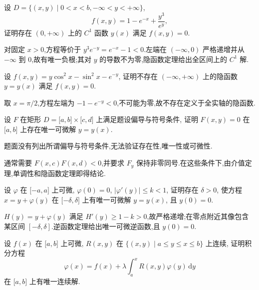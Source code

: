 \begin{example}
    设 $D=\{(x,y)\mid0<x<b,-\infty<y<+\infty\}$,
    \[
        f(x,y)=1-e^{-x}+\dfrac{y^3}{e^y},
    \]
    证明存在 $(0,+\infty)$ 上的 $C^1$ 函数 $y(x)$ 满足 $f(x,y)=0$.
\end{example}
\exampleblank

\begin{solution}
    对固定 $x>0$,方程等价于 $y^3e^{-y}=e^{-x}-1<0$.左端在 $(-\infty,0)$ 严格递增并从 $-\infty$ 到 $0$,故有唯一负根;其对 $y$ 的导数不为零,隐函数定理给出全区间上的 $C^1$ 解.
\end{solution}

\begin{example}
    设 $f(x,y)=y\cos^2x-\sin^2x-e^{-y}$, 证明不存在 $(-\infty,+\infty)$ 上的隐函数 $y=y(x)$ 满足 $f(x,y)=0$.
\end{example}
\exampleblank

\begin{solution}
    取 $x=\pi/2$,方程左端为 $-1-e^{-y}<0$,不可能为零,故不存在定义于全实轴的隐函数.
\end{solution}

\begin{example}
    设 $F$ 在矩形 $D=\lbrack a,b\rbrack\times\lbrack c,d\rbrack$ 上满足题设偏导与符号条件, 证明 $F(x,y)=0$ 在 $\lbrack a,b\rbrack$ 上存在唯一可微解 $y=y(x)$.
\end{example}
\exampleblank

\begin{solution}
    题面没有列出所谓偏导与符号条件,无法验证存在性,唯一性或可微性.

    通常需要 $F(x,c)F(x,d)<0$,并要求 $F_y$ 保持非零同号.在这些条件下,由介值定理,单调性和隐函数定理即得结论.
\end{solution}

\begin{example}
    设 $\varphi$ 在 $\lbrack-a,a\rbrack$ 上可微, $\varphi(0)=0$, $|\varphi'(y)|\leq k<1$, 证明存在 $\delta>0$, 使方程 $x=y+\varphi(y)$ 在 $\lbrack-\delta,\delta\rbrack$ 上有唯一可微解 $y=y(x)$, 且 $y(0)=0$.
\end{example}
\exampleblank

\begin{solution}
    $H(y)=y+\varphi(y)$ 满足 $H'(y)\geq1-k>0$,故严格递增;在零点附近其像包含某区间 $[-\delta,\delta]$.逆函数定理给出唯一可微逆函数,且 $y(0)=0$.
\end{solution}

\begin{example}
    设 $f(x)$ 在 $\lbrack a,b\rbrack$ 上可微, $R(x,y)$ 在 $\{(x,y)\mid a\leq y\leq x\leq b\}$ 上连续, 证明积分方程
    \[
        \varphi(x)=f(x)+\lambda\int_a^xR(x,y)\varphi(y)\,\mathrm{d}y
    \]
    在 $\lbrack a,b\rbrack$ 上有唯一连续解.
\end{example}
\exampleblank

